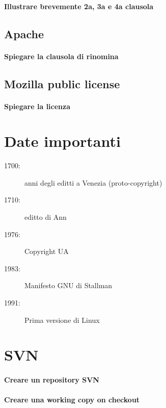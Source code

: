 \documentclass[a4paper]{article}
\begin{document}
			\paragraph{Illustrare brevemente 2a, 3a e 4a clausola}
			
		\subsection{Apache}
		
			\paragraph{Spiegare la clausola di rinomina}
			
	
		\subsection{Mozilla public license}
		
			\paragraph{Spiegare la licenza}
		
		
	\section{Date importanti}
	
	\begin{description}
		\item[1700:] anni degli editti a Venezia (proto-copyright)
		\item[1710:] editto di Ann
		\item[1976:] Copyright UA
		\item[1983:] Manifesto GNU di Stallman
		\item[1991:] Prima versione di Linux
	\end{description}
	
	
	\section{SVN}
	
	\paragraph{Creare un repository SVN}
	
	\paragraph{Creare una working copy on checkout}
	
\end{document}
